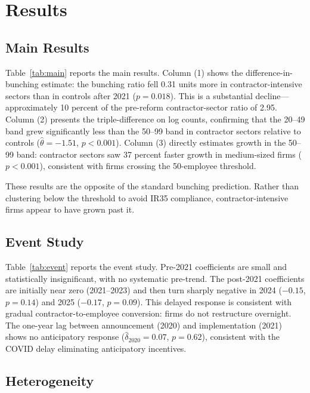 \documentclass[12pt]{article}
\begin{document}
\section{Results}

\subsection{Main Results}



Table~\ref{tab:main} reports the main results. Column (1) shows the difference-in-bunching estimate: the bunching ratio fell 0.31 units more in contractor-intensive sectors than in controls after 2021 ($p = 0.018$). This is a substantial decline---approximately 10 percent of the pre-reform contractor-sector ratio of 2.95. Column (2) presents the triple-difference on log counts, confirming that the 20--49 band grew significantly less than the 50--99 band in contractor sectors relative to controls ($\hat{\theta} = -1.51$, $p < 0.001$). Column (3) directly estimates growth in the 50--99 band: contractor sectors saw 37 percent faster growth in medium-sized firms ($p < 0.001$), consistent with firms crossing the 50-employee threshold.

These results are the opposite of the standard bunching prediction. Rather than clustering below the threshold to avoid IR35 compliance, contractor-intensive firms appear to have grown past it.

\subsection{Event Study}



Table~\ref{tab:event} reports the event study. Pre-2021 coefficients are small and statistically insignificant, with no systematic pre-trend. The post-2021 coefficients are initially near zero (2021--2023) and then turn sharply negative in 2024 ($-0.15$, $p = 0.14$) and 2025 ($-0.17$, $p = 0.09$). This delayed response is consistent with gradual contractor-to-employee conversion: firms do not restructure overnight. The one-year lag between announcement (2020) and implementation (2021) shows no anticipatory response ($\hat{\delta}_{2020} = 0.07$, $p = 0.62$), consistent with the COVID delay eliminating anticipatory incentives.

\subsection{Heterogeneity}
\end{document}

